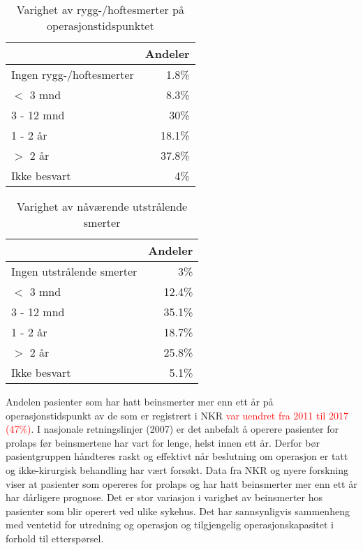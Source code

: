 \documentclass [norsk,a4paper,twoside]{article}\usepackage[]{graphicx}\usepackage[]{color}
\newcommand{\kommentar}[1]{\cbstart\textcolor{red}{#1\cbend}}
\begin{document}
\begin{table}[ht]
\centering
\begin{tabular}{lr}
  \hline
 & Andeler \\ 
  \hline
Ingen rygg-/hoftesmerter & 1.8\% \\ 
  $<$ 3 mnd & 8.3\% \\ 
  3 - 12 mnd & 30\% \\ 
  1 - 2 år & 18.1\% \\ 
  $>$ 2 år & 37.8\% \\ 
  Ikke besvart & 4\% \\ 
   \hline
\end{tabular}
\caption{Varighet av rygg-/hoftesmerter på operasjonstidspunktet} 
\label{tab:SmRH}
\end{table}
\begin{table}[ht]
\centering
\begin{tabular}{lr}
  \hline
 & Andeler \\ 
  \hline
Ingen utstrålende smerter & 3\% \\ 
  $<$ 3 mnd & 12.4\% \\ 
  3 - 12 mnd & 35.1\% \\ 
  1 - 2 år & 18.7\% \\ 
  $>$ 2 år & 25.8\% \\ 
  Ikke besvart & 5.1\% \\ 
   \hline
\end{tabular}
\caption{Varighet av nåværende utstrålende smerter} 
\label{tab:Utstr}
\end{table}


Andelen pasienter som har hatt beinsmerter mer enn ett år på
operasjonstidspunkt av de som er registrert i NKR \kommentar{var uendret fra 2011 til 2017 (47\%)}. 
I nasjonale retningslinjer (2007) er det anbefalt å operere pasienter for prolaps før
beinsmertene har vart for lenge, helst innen ett år. Derfor bør
pasientgruppen håndteres raskt og effektivt når beslutning om operasjon er tatt og
ikke-kirurgisk behandling har vært forsøkt. Data fra NKR og nyere forskning viser at
pasienter som opereres for prolaps og har hatt beinsmerter mer enn ett år har
dårligere prognose. 
Det er stor variasjon i varighet av beinsmerter hos pasienter som blir
operert ved ulike sykehus. Det har sannsynligvis sammenheng med ventetid for
utredning og operasjon og tilgjengelig operasjonskapasitet i forhold til etterspørsel.
\end{document}
